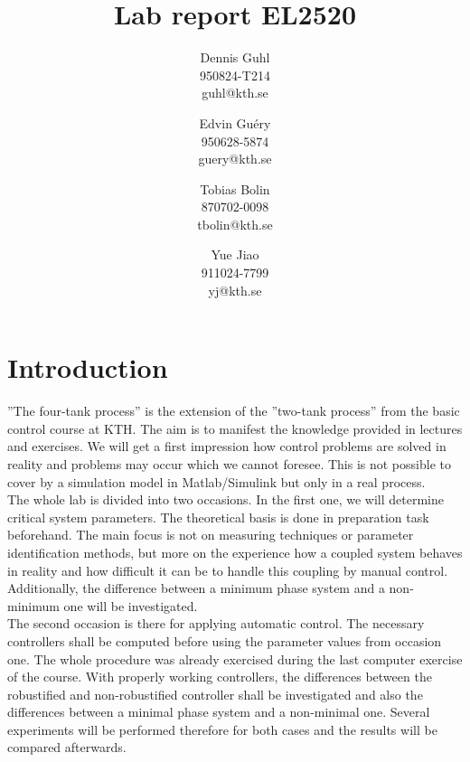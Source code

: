 \documentclass[a4paper,12pt,oneside,onecolumn]{article}
\begin{document}
           

\title{Lab report EL2520}
\author{
  Dennis Guhl \\ 950824-T214 \\ guhl@kth.se 
  \and 
  Edvin Gu\'ery\\ 950628-5874 \\guery@kth.se
  \and
  Tobias Bolin \\ 870702-0098 \\ tbolin@kth.se
  \and
  Yue Jiao \\ 911024-7799 \\ yj@kth.se
  }


\maketitle 
\section{Introduction}
''The four-tank process'' is the extension of the ''two-tank process'' from the basic control course at KTH. The aim is to manifest the knowledge provided in lectures and exercises. We will get a first impression how control problems are solved in reality and problems may occur which we cannot foresee. This is not possible to cover by a simulation model in Matlab/Simulink but only in a real process.\\
The whole lab is divided into two occasions. In the first one, we will determine critical system parameters. The theoretical basis is done in preparation task beforehand. The main focus is not on measuring techniques or parameter identification methods, but more on the experience how a coupled system behaves in reality and how difficult it can be to handle this coupling by manual control. Additionally, the difference between a minimum phase system and a non-minimum one will be investigated.\\
The second occasion is there for applying automatic control. The necessary controllers shall be computed before using the parameter values from occasion one. The whole procedure was already exercised during the last computer exercise of the course. With properly working controllers, the differences between the robustified and non-robustified controller shall be investigated and also the differences between a minimal phase system and a non-minimal one. Several experiments will be performed therefore for both cases and the results will be compared afterwards.\\
\end{document}

